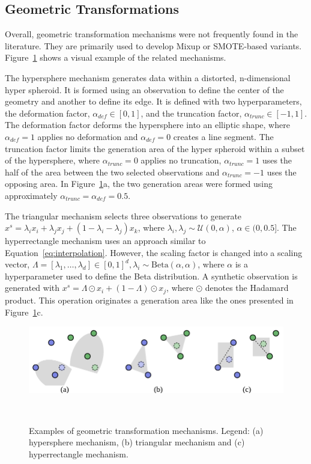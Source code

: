 \subsection{Geometric Transformations}

Overall, geometric transformation mechanisms were not frequently found in the
literature. They are primarily used to develop Mixup or SMOTE-based variants.
Figure~\ref{fig:geometric-transformations} shows a visual example of the
related mechanisms.

The hypersphere mechanism generates data within a distorted, n-dimensional
hyper spheroid. It is formed using an observation to define the center of
the geometry and another to define its edge.
It is defined with two hyperparameters, the deformation
factor, $\alpha_{def} \in [0, 1]$, and the truncation factor, $\alpha_{trunc}
\in [-1, 1]$. The deformation factor deforms the hypersphere into an elliptic
shape, where $\alpha_{def}=1$ applies no deformation and $\alpha_{def}=0$
creates a line segment. The truncation factor limits the generation area of
the hyper spheroid within a subset of the hypersphere, where $\alpha_{trunc}=0$
applies no truncation, $\alpha_{trunc}=1$ uses the half of the area between
the two selected observations and $\alpha_{trunc}=-1$ uses the opposing area.
In Figure~\ref{fig:geometric-transformations}a, the two generation areas were
formed using approximately $\alpha_{trunc} = \alpha_{def} = 0.5$.

The triangular mechanism selects three observations to generate $x^s =
\lambda_ix_i + \lambda_jx_j + (1-\lambda_i-\lambda_j)x_k$, where $\lambda_i,
\lambda_j \sim \mathcal{U}(0, \alpha)$, $\alpha \in (0, 0.5]$. The
hyperrectangle mechanism uses an approach similar to
Equation~\ref{eq:interpolation}. However, the scaling factor is changed into a
scaling vector, $\Lambda = [\lambda_1,\dots,\lambda_d ] \in [0,1]^d, \lambda_i
\sim \text{Beta}(\alpha, \alpha)$, where $\alpha$ is a hyperparameter used to
define the Beta distribution. A synthetic observation is generated with $x^s =
\Lambda \odot x_i + (1-\Lambda) \odot x_j$, where $\odot$ denotes the Hadamard
product. This operation originates a generation area like the ones presented
in Figure~\ref{fig:geometric-transformations}c.

\begin{figure}
	\centering
	\includegraphics[width=.7\linewidth]{figures/synthetic-data-review/geometric-transformations}
    \caption[Examples of geometric transformation mechanisms.]{%
        Examples of geometric transformation mechanisms. Legend: (a)
        hypersphere mechanism, (b) triangular mechanism and (c)
        hyperrectangle mechanism.
    }~\label{fig:geometric-transformations}
\end{figure}

